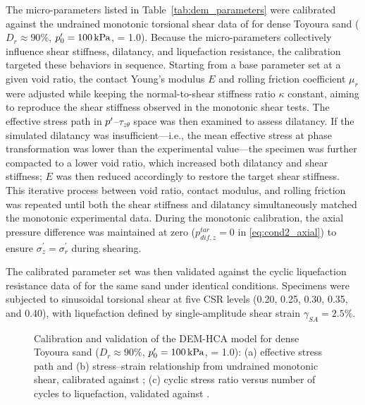 The micro-parameters listed in Table~\ref{tab:dem_parameters} were calibrated against the undrained monotonic torsional shear data of \citet{Nakata1998} for dense Toyoura sand ($D_r \approx 90\%$, $p^\prime_0=\SI{100}{kPa}$, \Kzero{} = 1.0). Because the micro-parameters collectively influence shear stiffness, dilatancy, and liquefaction resistance, the calibration targeted these behaviors in sequence. Starting from a base parameter set at a given void ratio, the contact Young's modulus $E$ and rolling friction coefficient $\mu_r$ were adjusted while keeping the normal-to-shear stiffness ratio $\kappa$ constant, aiming to reproduce the shear stiffness observed in the monotonic shear tests. The effective stress path in $p^\prime$--$\tau_{z\theta}$ space was then examined to assess dilatancy. If the simulated dilatancy was insufficient---i.e., the mean effective stress at phase transformation was lower than the experimental value---the specimen was further compacted to a lower void ratio, which increased both dilatancy and shear stiffness; $E$ was then reduced accordingly to restore the target shear stiffness. This iterative process between void ratio, contact modulus, and rolling friction was repeated until both the shear stiffness and dilatancy simultaneously matched the monotonic experimental data. During the monotonic calibration, the axial pressure difference was maintained at zero ($p_{dif,z}^{tar}=0$ in \cref{eq:cond2_axial}) to ensure $\sigma_z^{\prime}=\sigma_r^{\prime}$ during shearing.

The calibrated parameter set was then validated against the cyclic liquefaction resistance data of \citet{Ishihara1985} for the same sand under identical conditions. Specimens were subjected to sinusoidal torsional shear at five CSR levels (0.20, 0.25, 0.30, 0.35, and 0.40), with liquefaction defined by single-amplitude shear strain $\gamma_{SA}=2.5\%$.

\begin{figure}[t]
  \centering
  \caption{Calibration and validation of the DEM-HCA model for dense Toyoura sand ($D_r \approx 90\%$, $p^\prime_0=\SI{100}{kPa}$, \Kzero{} = 1.0): (a) effective stress path and (b) stress--strain relationship from undrained monotonic shear, calibrated against \citet{Nakata1998}; (c) cyclic stress ratio versus number of cycles to liquefaction, validated against \citet{Ishihara1985}.}
  \label{fig:validation_combined}
\end{figure}

